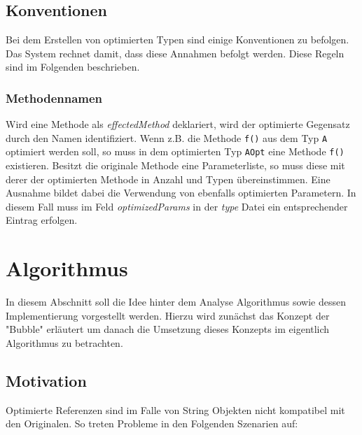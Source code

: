\begin{description}
\end{description}

\subsection{Konventionen}\label{subs:conventions}

Bei dem Erstellen von optimierten Typen sind einige Konventionen zu befolgen. Das 
System rechnet damit, dass diese Annahmen befolgt werden. Diese Regeln sind im Folgenden
beschrieben.

\subsubsection{Methodennamen}

Wird eine Methode als \textit{effectedMethod} deklariert, wird der optimierte Gegensatz
durch den Namen identifiziert. Wenn z.B. die Methode \texttt{f()} aus dem Typ \texttt{A}
optimiert werden soll, so muss in dem optimierten Typ \texttt{AOpt} eine Methode
\texttt{f()} existieren. Besitzt die originale Methode eine Parameterliste, so muss
diese mit derer der optimierten Methode in Anzahl und Typen übereinstimmen. Eine Ausnahme
bildet dabei die Verwendung von ebenfalls optimierten Parametern. In diesem Fall muss im Feld 
\textit{optimizedParams} in der \textit{type} Datei ein entsprechender Eintrag erfolgen.


\section{Algorithmus}

In diesem Abschnitt soll die Idee hinter dem Analyse Algorithmus sowie dessen
Implementierung vorgestellt werden. Hierzu wird zunächst das Konzept der "Bubble"
erläutert um danach die Umsetzung dieses Konzepts im eigentlich Algorithmus zu 
betrachten.

\subsection{Motivation}

Optimierte Referenzen sind im Falle von String Objekten nicht kompatibel mit den 
Originalen. So treten Probleme in den Folgenden Szenarien auf:

